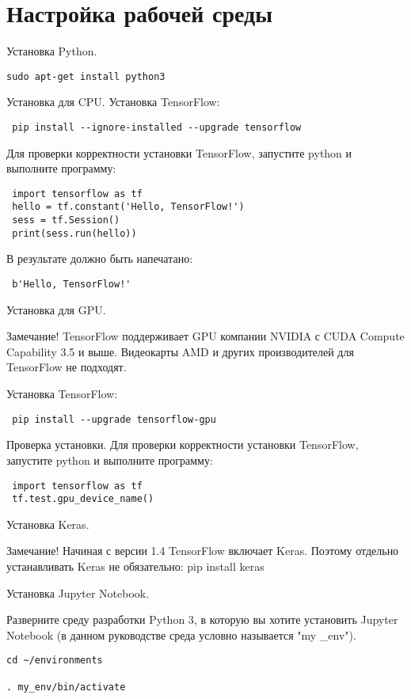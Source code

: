 \chapter{Настройка рабочей среды}



Установка Python.
\begin{lstlisting}
sudo apt-get install python3
\end{lstlisting}


Установка для CPU.
Установка TensorFlow:
 \begin{lstlisting}
 pip install --ignore-installed --upgrade tensorflow
\end{lstlisting}

Для проверки корректности установки TensorFlow, запустите python и выполните программу:
 \begin{lstlisting}
 import tensorflow as tf
 hello = tf.constant('Hello, TensorFlow!')
 sess = tf.Session()
 print(sess.run(hello))
\end{lstlisting}
 
В результате должно быть напечатано:
 \begin{lstlisting}
 b'Hello, TensorFlow!'
 \end{lstlisting}
 
Установка для GPU.

Замечание! TensorFlow поддерживает GPU компании NVIDIA с CUDA Compute Capability 3.5 и выше. Видеокарты AMD и других производителей для TensorFlow не подходят.

Установка TensorFlow:
 \begin{lstlisting}
 pip install --upgrade tensorflow-gpu
\end{lstlisting}

Проверка установки. Для проверки корректности установки TensorFlow, запустите python и выполните программу:
 \begin{lstlisting}
 import tensorflow as tf
 tf.test.gpu_device_name()
\end{lstlisting}

Установка Keras.

Замечание! Начиная с версии 1.4 TensorFlow включает Keras. Поэтому отдельно устанавливать Keras не обязательно:
pip install keras 


Установка Jupyter Notebook.


Разверните среду разработки Python 3, в которую вы хотите установить Jupyter Notebook (в данном руководстве среда условно называется "my _env").

 \begin{lstlisting}
cd ~/environments

. my_env/bin/activate
\end{lstlisting}


